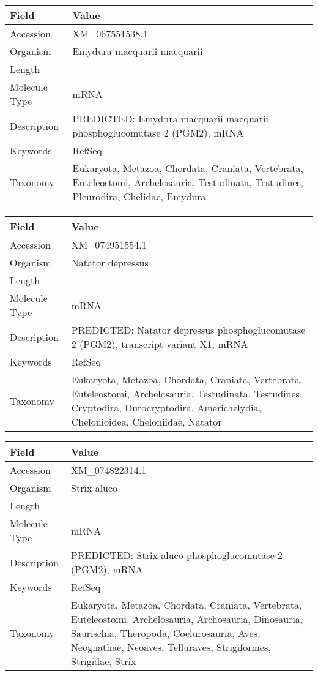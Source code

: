 \documentclass[10pt]{article}
\begin{document}
{\footnotesize
\begin{longtable}{>{\raggedright\arraybackslash}p{4.5cm} >{\raggedright\arraybackslash}p{11.5cm}}
\textbf{Field} & \textbf{Value} \\
\hline
Accession & XM\_067551538.1 \\
Organism & Emydura macquarii macquarii \\
Length & 4567 \\
Molecule Type & mRNA \\
Description & PREDICTED: Emydura macquarii macquarii phosphoglucomutase 2 (PGM2), mRNA \\
Keywords & RefSeq \\
Taxonomy & Eukaryota, Metazoa, Chordata, Craniata, Vertebrata, Euteleostomi, Archelosauria, Testudinata, Testudines, Pleurodira, Chelidae, Emydura \\
\end{longtable}
}

{\footnotesize
\begin{longtable}{>{\raggedright\arraybackslash}p{4.5cm} >{\raggedright\arraybackslash}p{11.5cm}}
\textbf{Field} & \textbf{Value} \\
\hline
Accession & XM\_074951554.1 \\
Organism & Natator depressus \\
Length & 4092 \\
Molecule Type & mRNA \\
Description & PREDICTED: Natator depressus phosphoglucomutase 2 (PGM2), transcript variant X1, mRNA \\
Keywords & RefSeq \\
Taxonomy & Eukaryota, Metazoa, Chordata, Craniata, Vertebrata, Euteleostomi, Archelosauria, Testudinata, Testudines, Cryptodira, Durocryptodira, Americhelydia, Chelonioidea, Cheloniidae, Natator \\
\end{longtable}
}

{\footnotesize
\begin{longtable}{>{\raggedright\arraybackslash}p{4.5cm} >{\raggedright\arraybackslash}p{11.5cm}}
\textbf{Field} & \textbf{Value} \\
\hline
Accession & XM\_074822314.1 \\
Organism & Strix aluco \\
Length & 2239 \\
Molecule Type & mRNA \\
Description & PREDICTED: Strix aluco phosphoglucomutase 2 (PGM2), mRNA \\
Keywords & RefSeq \\
Taxonomy & Eukaryota, Metazoa, Chordata, Craniata, Vertebrata, Euteleostomi, Archelosauria, Archosauria, Dinosauria, Saurischia, Theropoda, Coelurosauria, Aves, Neognathae, Neoaves, Telluraves, Strigiformes, Strigidae, Strix \\
\end{longtable}
}
\end{document}
